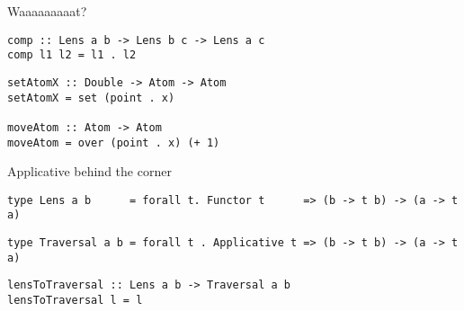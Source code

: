 \documentclass[presentation,aspectratio=169,8pt]{beamer}
\begin{document}
\begin{frame}[label={sec:org2b37169},fragile]{Waaaaaaaaat?}
 \begin{verbatim}
comp :: Lens a b -> Lens b c -> Lens a c
comp l1 l2 = l1 . l2
\end{verbatim}

\pause

\begin{verbatim}
setAtomX :: Double -> Atom -> Atom
setAtomX = set (point . x)

moveAtom :: Atom -> Atom
moveAtom = over (point . x) (+ 1)
\end{verbatim}
\end{frame}

\begin{frame}[label={sec:org9763d9c},fragile]{Applicative behind the corner}
 \begin{verbatim}
type Lens a b      = forall t. Functor t      => (b -> t b) -> (a -> t a)
\end{verbatim}

\pause

\begin{verbatim}
type Traversal a b = forall t . Applicative t => (b -> t b) -> (a -> t a)
\end{verbatim}

\pause

\begin{verbatim}
lensToTraversal :: Lens a b -> Traversal a b
lensToTraversal l = l
\end{verbatim}
\end{frame}
\end{document}
